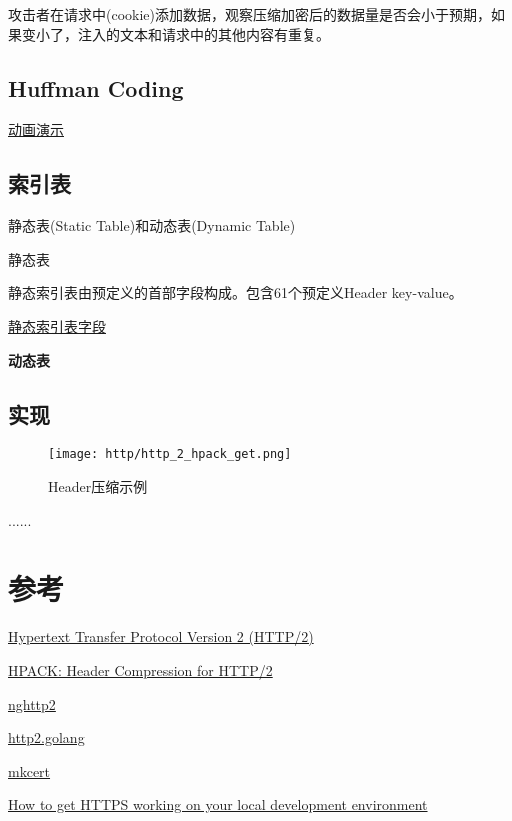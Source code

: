 攻击者在请求中(cookie)添加数据，观察压缩加密后的数据量是否会小于预期，如果变小了，注入的文本和请求中的其他内容有重复。


\subsection{Huffman Coding}

\href{https://people.ok.ubc.ca/ylucet/DS/Huffman.html}{动画演示}

\subsection{索引表}

静态表(Static Table)和动态表(Dynamic Table)

\textbf{}{静态表}

静态索引表由预定义的首部字段构成。包含61个预定义Header key-value。

\href{https://tools.ietf.org/html/rfc7541#appendix-A}{静态索引表字段}


\textbf{动态表}

\subsection{实现}

\begin{figure}[H]
    \centering
    \texttt{[image: http/http\_2\_hpack\_get.png]}
    \caption{Header压缩示例}
\end{figure}

......

\section{参考}

\href{https://tools.ietf.org/html/rfc7540}{Hypertext Transfer Protocol Version 2 (HTTP/2)} 

\href{https://tools.ietf.org/html/rfc7541}{HPACK: Header Compression for HTTP/2} 

\href{https://nghttp2.org/}{nghttp2}

\href{https://http2.golang.org/}{http2.golang}

\href{https://github.com/FiloSottile/mkcert}{mkcert}

\href{https://www.freecodecamp.org/news/how-to-get-https-working-on-your-local-development-environment-in-5-minutes-7af615770eec/}{How to get HTTPS working on your local development environment}

